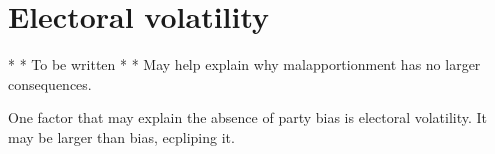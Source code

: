 \documentclass[letter,12pt]{article}
\begin{document}




\section{Electoral volatility}

* * To be written * * May help explain why malapportionment has no larger consequences. 

One factor that may explain the absence of party bias is electoral volatility. It may be larger than bias, ecpliping it.
\end{document}
